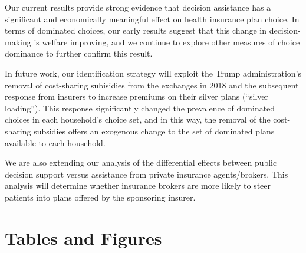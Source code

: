 \documentclass[12pt]{article}
\begin{document}
Our current results provide strong evidence that decision assistance has a significant and economically meaningful effect on health insurance plan choice. In terms of dominated choices, our early results suggest that this change in decision-making is welfare improving, and we continue to explore other measures of choice dominance to further confirm this result.

In future work, our identification strategy will exploit the Trump administration's removal of cost-sharing subisidies from the exchanges in 2018 and the subsequent response from insurers to increase premiums on their silver plans (``silver loading''). This response significantly changed the prevalence of dominated choices in each household's choice set, and in this way, the removal of the cost-sharing subsidies offers an exogenous change to the set of dominated plans available to each household.

We are also extending our analysis of the differential effects between public decision support versus assistance from private insurance agents/brokers. This analysis will determine whether insurance brokers are more likely to steer patients into plans offered by the sponsoring insurer.

\pagebreak



\clearpage
\newpage


\section*{Tables and Figures}
\end{document}
